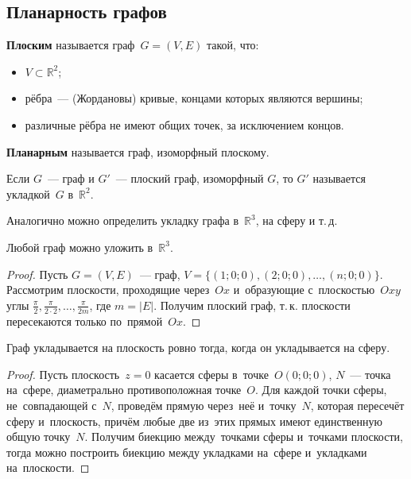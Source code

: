 \subsection{Планарность графов}
\begin{definition}
\textbf{Плоским} называется граф~$G = (V, E)$ такой, что:
\begin{itemize}
	\item $V \subset \mathbb R^2$;
	\item рёбра~--- (Жордановы) кривые, концами которых являются вершины;
	\item различные рёбра не имеют общих точек, за исключением концов.
\end{itemize}
\end{definition}

\begin{definition}
\textbf{Планарным} называется граф, изоморфный плоскому.
\end{definition}

\begin{definition}
Если $G$~--- граф и $G'$~--- плоский граф, изоморфный $G$, то $G'$ называется укладкой~$G$ в~$\mathbb R^2$.
\end{definition}

Аналогично можно определить укладку графа в~$\mathbb R^3$, на сферу и т.\,д.

\begin{theorem}
Любой граф можно уложить в~$\mathbb R^3$.
\end{theorem}
\begin{proof}
Пусть $G = (V, E)$~--- граф, $V = \{ (1; 0; 0), (2; 0; 0), \ldots, (n; 0; 0) \}$.
Рассмотрим плоскости, проходящие через~$Ox$ и~образующие с~плоскостью~$Oxy$ углы $\frac\pi2, \frac\pi{2\cdot2}, \ldots, \frac\pi{2m}$, где $m = |E|$.
Получим плоский граф, т.\,к. плоскости пересекаются только по~прямой~$Ox$.
\end{proof}

\begin{theorem}
Граф укладывается на плоскость ровно тогда, когда он укладывается на сферу.
\end{theorem}
\begin{proof}
Пусть плоскость~$z = 0$ касается сферы в~точке~$O(0; 0; 0)$, $N$~--- точка на~сфере, диаметрально противоположная точке~$O$.
Для каждой точки сферы, не~совпадающей с~$N$, проведём прямую через~неё и~точку~$N$, которая пересечёт сферу и~плоскость, причём любые две из~этих прямых имеют единственную общую точку~$N$.
Получим биекцию между~точками сферы и~точками плоскости, тогда можно построить биекцию между укладками на~сфере и~укладками на~плоскости.
\end{proof}

